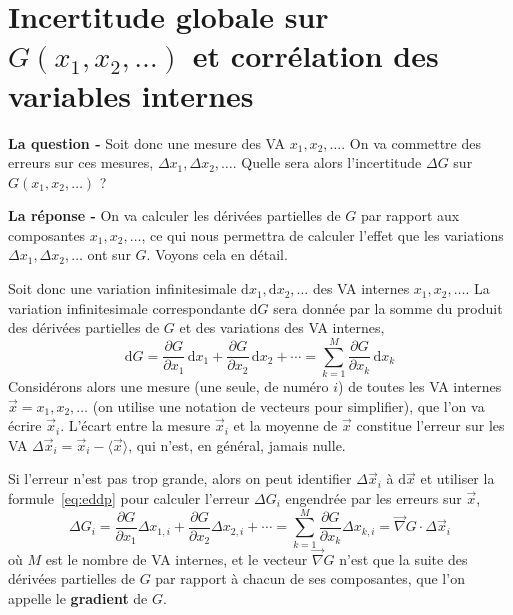 \section{Incertitude globale sur $G(x_1,x_2,\dots)$ et corrélation des variables internes}

\textbf{La question -} Soit donc une mesure des VA $x_1,x_2,\dots$. On va commettre des erreurs sur ces mesures, $\Delta x_1,\Delta x_2,\dots$. Quelle sera alors l'incertitude $\Delta G$ sur $G(x_1,x_2,\dots)$ ?

\textbf{La réponse -} On va calculer les dérivées partielles de $G$ par rapport aux composantes $x_1,x_2,\dots$, ce qui nous permettra de calculer l'effet que les variations $\Delta x_1,\Delta x_2,\dots$ ont sur $G$. Voyons cela en détail.

Soit donc une variation infinitesimale $\text{d}x_1,\text{d}x_2,\dots$ des VA internes $x_1,x_2,\dots$. La variation infinitesimale correspondante $\text{d}G$ sera donnée par la somme du produit des dérivées partielles de $G$ et des variations des VA internes,
\begin{equation}
\text{d} G=\frac{\partial G}{\partial x_1}\,\text{d} x_{1}
+\frac{\partial G}{\partial x_2}\,\text{d} x_{2}+\cdots
=\sum\limits_{k=1}^{M}\frac{\partial G}{\partial x_k}\,\text{d} x_{k}
\label{eq:eddp}
\end{equation}
Considérons alors une mesure (une seule, de numéro $i$) de toutes les VA internes $\vec{x}=x_1,x_2,\dots$ (on utilise une notation de vecteurs pour simplifier), que l'on va écrire $\vec{x}_i$. L'écart entre la mesure $\vec{x}_i$ et la moyenne de $\vec{x}$ constitue l'erreur sur les VA $\Delta\vec{x}_i=\vec{x}_i-\langle\vec{x}\rangle$, qui n'est, en général, jamais nulle.

Si l'erreur n'est pas trop grande, alors on peut identifier $\Delta\vec{x}_i$ à $\text{d}\vec{x}$ et utiliser la formule~\ref{eq:eddp} pour calculer l'erreur $\Delta G_i$ engendrée par les erreurs sur $\vec{x}$,
\begin{equation}
\Delta G_i=\frac{\partial G}{\partial x_1}\Delta x_{1,i}
+\frac{\partial G}{\partial x_2}\Delta x_{2,i}+\cdots
=\sum\limits_{k=1}^{M}\frac{\partial G}{\partial x_k}\Delta x_{k,i}=\vec{\nabla} G\cdot\Delta\vec{x}_i
\end{equation}
où $M$ est le nombre de VA internes, et le vecteur $\vec{\nabla} G$ n'est que la suite des dérivées partielles de $G$ par rapport à chacun de ses composantes, que l'on appelle le \textbf{gradient} de $G$.

